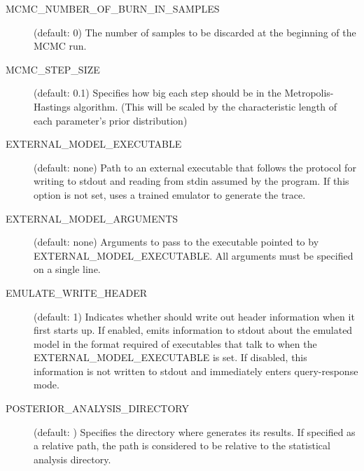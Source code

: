 \begin{description}
    \item[MCMC\_NUMBER\_OF\_BURN\_IN\_SAMPLES] (default: 0) The number of samples to be discarded at the beginning of the MCMC run.

    \item[MCMC\_STEP\_SIZE] (default: 0.1) Specifies how big each step should be in the Metropolis-Hastings algorithm. (This will be scaled by the characteristic length of each parameter's prior distribution)

    \item[EXTERNAL\_MODEL\_EXECUTABLE] (default: none) Path to an external executable that follows the protocol for writing to stdout and reading from stdin assumed by the  program. If this option is not set,  uses a trained emulator to generate the trace.

    \item[EXTERNAL\_MODEL\_ARGUMENTS] (default: none) Arguments to pass to the executable pointed to by EXTERNAL\_MODEL\_EXECUTABLE. All arguments must be specified on a single line.

    \item[EMULATE\_WRITE\_HEADER] (default: 1) Indicates whether  should write out header information when it first starts up. If enabled, emits information to stdout about the emulated model in the format required of executables that talk to  when the EXTERNAL\_MODEL\_EXECUTABLE is set. If disabled, this information is not written to stdout and  immediately enters query-response mode.

    \item[POSTERIOR\_ANALYSIS\_DIRECTORY] (default: ) Specifies the directory where  generates its results. If specified as a relative path, the path is considered to be relative to the statistical analysis directory.
\end{description}

